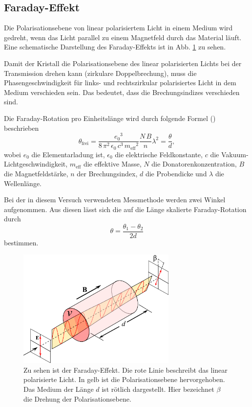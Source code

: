 \subsection{Faraday-Effekt}
Die Polarisationsebene von linear polarisiertem Licht in einem Medium wird gedreht, wenn das Licht parallel zu einem Magnetfeld durch das Material läuft. \cite{heintze}
Eine schematische Darstellung des Faraday-Effekts ist in Abb. \ref{fig:FaradayEffekt} zu sehen.

Damit der Kristall die Polarisationsebene des linear polarisierten Lichts bei der Transmission drehen kann (zirkulare Doppelbrechung), muss die Phasengeschwindigkeit für links- und rechtszirkular polarisiertes Licht in dem Medium verschieden sein. Das bedeutet, dass die Brechungsindizes verschieden sind. \cite{V46}

Die Faraday-Rotation pro Einheitslänge wird durch folgende Formel (\cite{V46}) beschrieben
\begin{equation}
    \theta_\text{frei} = \frac{{e_0}^3}{8 \, \pi^2 \, \epsilon_0 \, c^3 \, {m_\text{eff}}^2} \frac{N \, B}{n} \lambda^2 = \frac{\theta}{d},
    \label{eq:theta}
\end{equation}
wobei $e_0$ die Elementarladung ist, $\epsilon_0$ die elektrische Feldkonstante, $c$ die Vakuum-Lichtgeschwindigkeit, $m_\text{eff}$ die effektive Masse, $N$ die Donatorenkonzentration, $B$ die Magnetfeldstärke, $n$ der Brechungsindex, $d$ die Probendicke und $\lambda$ die Wellenlänge.

Bei der in diesem Versuch verwendeten Messmethode werden zwei Winkel aufgenommen. Aus diesen lässt sich die auf die Länge skalierte Faraday-Rotation durch
\begin{equation}
    \theta = \frac{\theta_1 - \theta_2}{2d}
    \label{eq:rotation}
\end{equation}
bestimmen.

\begin{figure}
    \centering
    \includegraphics[width=0.7\textwidth]{fotos/FaradayEffekt.png}
    \caption{Zu sehen ist der Faraday-Effekt. Die rote Linie beschreibt das linear polarisierte Licht. In gelb ist die Polarisationsebene hervorgehoben. Das Medium der Länge $d$ ist rötlich dargestellt. Hier bezeichnet $\beta$ die Drehung der Polarisationsebene. \cite{Faraday}}
    \label{fig:FaradayEffekt}    
\end{figure}